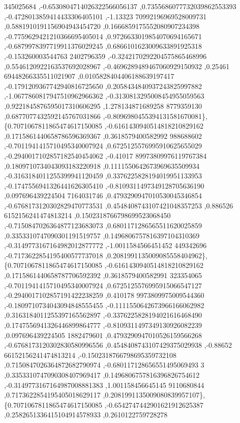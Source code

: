 \begin{DoxyCode}
      345025684 ,-0.6530804714026322566056137 ,0.7355686077732039862553393 ,-0.4728013859414433306405101 ,-1.13323
      70992196969528009731 ,0.5881910191156904943454720 ,0.1666859175552080907234398 ,-0.7759629421210366695405014
       ,0.9726633019854070694165671 ,-0.6879978397719911376029245 ,0.6866101623009633891925318 ,-0.153260003544763
      2402796359 ,-0.3242170292204575865468996 ,0.5546120922163537692028967 ,-0.4696289489467060929150932 ,0.25461
      69448266335511021907 ,0.0105828404406188639197417 ,-0.1791209367742940816725650 ,0.2058434840937243825997882
       ,-1.0677860817947510962966362 ,-0.3130813295008454955059563 ,0.9221845876595017310606295 ,1.278134871689258
      8779359130 ,0.6877077432592145767031866 ,-0.8096980455394131581670081\},
\{0.7071067811865474617150085 ,-0.6161430940514818210829162 ,0.1715861440658786596369367 ,0.3618579400582992
      988688602 ,-0.7011941415710495340007924 ,0.6725125576995910625655029 ,-0.2940017102857182540454062 ,-0.41017
      89973809976119767384 ,0.1809710734043093183220918 ,0.1111550642673969635509934 ,-0.3163184011255399941120459
       ,0.3376225828194019951133953 ,-0.1747556941326441626305410 ,-0.8109311497349128705636190 ,0.097696439224504
      7164031746 ,0.4793290947010530045346854 ,-0.6768173120302829470773531 ,0.4548408743107421048357253 ,0.886526
      6152156241474813214 ,0.1502318766798699523068450 ,-0.7150847026364877123683073 ,0.6801171286565511620025859 
      ,0.3353310747090301191519757 ,0.1496806757816397104310369 ,-0.3149773167164982012877772 ,-1.0011584566451452
      449342696 ,-0.7173622854195400577737018 ,0.2081991135009085558404962\},
\{0.7071067811865474617150085 ,-0.6161430940514818210829162 ,0.1715861440658787706592392 ,0.3618579400582991
      323354065 ,-0.7011941415710495340007924 ,0.6725125576995915066547127 ,-0.2940017102857191422238259 ,0.410178
      9973809975009544360 ,-0.1809710734043094848555455 ,-0.1111550642673966166062982 ,0.3163184011255397165562897
       ,-0.3376225828194021616468490 ,0.1747556941326446899864777 ,-0.8109311497349130926082239 ,0.097696439224505
      1882479601 ,0.4793290947010526159566268 ,-0.6768173120302830580996556 ,0.4548408743107429375029938 ,-0.88652
      66152156241474813214 ,-0.1502318766798695359732108 ,0.7150847026364872682790974 ,-0.680117128656551495069493
      3 ,0.3353310747090308407969417 ,0.1496806757816396826754612 ,-0.3149773167164987008881383 ,1.001158456645145
      9110680844 ,0.7173622854195405018629117 ,0.2081991135009080839957107\},
\{0.7071067811865474617150085 ,-0.6542747442901621912625387 ,0.2582651336415104914578933 ,0.2610122759728278

\end{DoxyCode}
